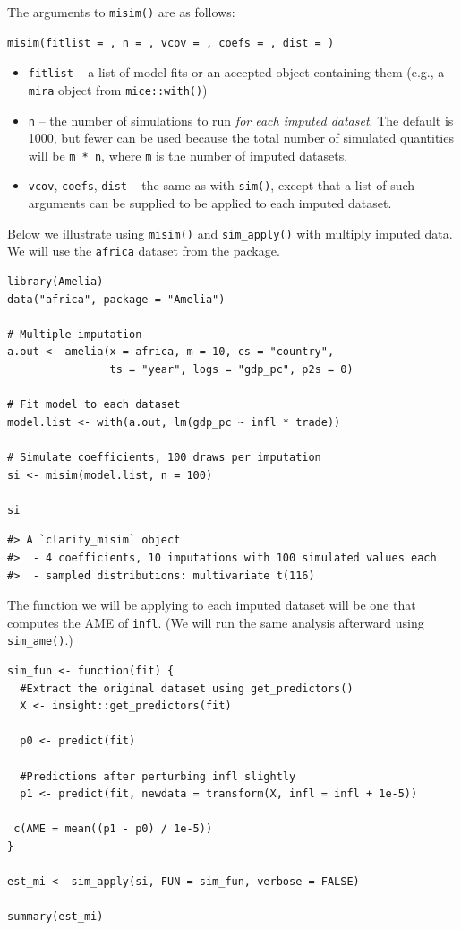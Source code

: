 The arguments to \texttt{misim()} are as follows:

\begin{verbatim}
misim(fitlist = , n = , vcov = , coefs = , dist = )
\end{verbatim}

\begin{itemize}
\item
  \texttt{fitlist} -- a list of model fits or an accepted object containing them (e.g., a \texttt{mira} object from \texttt{mice::with()})
\item
  \texttt{n} -- the number of simulations to run \emph{for each imputed dataset}. The default is 1000, but fewer can be used because the total number of simulated quantities will be \texttt{m\ *\ n}, where \texttt{m} is the number of imputed datasets.
\item
  \texttt{vcov}, \texttt{coefs}, \texttt{dist} -- the same as with \texttt{sim()}, except that a list of such arguments can be supplied to be applied to each imputed dataset.
\end{itemize}

Below we illustrate using \texttt{misim()} and \texttt{sim\_apply()} with multiply imputed data. We will use the \texttt{africa} dataset from the  package.

\begin{verbatim}
library(Amelia)
data("africa", package = "Amelia")

# Multiple imputation
a.out <- amelia(x = africa, m = 10, cs = "country",
                ts = "year", logs = "gdp_pc", p2s = 0)

# Fit model to each dataset
model.list <- with(a.out, lm(gdp_pc ~ infl * trade))

# Simulate coefficients, 100 draws per imputation
si <- misim(model.list, n = 100)

si
\end{verbatim}

\begin{verbatim}
#> A `clarify_misim` object
#>  - 4 coefficients, 10 imputations with 100 simulated values each
#>  - sampled distributions: multivariate t(116)
\end{verbatim}

The function we will be applying to each imputed dataset will be one that computes the AME of \texttt{infl}. (We will run the same analysis afterward using \texttt{sim\_ame()}.)

\begin{verbatim}
sim_fun <- function(fit) {
  #Extract the original dataset using get_predictors()
  X <- insight::get_predictors(fit)
  
  p0 <- predict(fit)
  
  #Predictions after perturbing infl slightly
  p1 <- predict(fit, newdata = transform(X, infl = infl + 1e-5))
  
 c(AME = mean((p1 - p0) / 1e-5))
}

est_mi <- sim_apply(si, FUN = sim_fun, verbose = FALSE)

summary(est_mi)
\end{verbatim}

